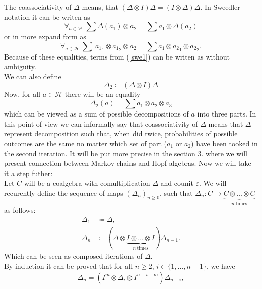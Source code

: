 \documentclass[a4paper]{article}
\begin{document}
The coassociativity of $\Delta$ means, that $(\Delta \otimes I)\Delta = (I \otimes \Delta)\Delta$.
In Sweedler notation it can be writen as
\begin{equation*}
\forall_{a \in \mathcal{H}}\ \sum\Delta(a_1) \otimes a_2 = \sum a_1 \otimes \Delta(a_2)
\end{equation*}
or in more expand form as
\begin{equation}\label{swe1}
\forall_{a\in \mathcal{H}}\ \sum\ {a_1}_1 \otimes {a_1}_2 \otimes a_2 = \sum a_1 \otimes {a_2}_1 
\otimes {a_2}_2.
\end{equation}
Because of these equalities, terms from (\ref{swe1}) can be writen as 
 without ambiguity. \\ We can also define 
\begin{equation*}
\Delta_2 \coloneqq (\Delta \otimes I)\Delta
\end{equation*}
Now, for all $a \in \mathcal{H}$ there will be an equality
\begin{equation*}
\Delta_2(a) = \sum a_1 \otimes a_2 \otimes a_3
\end{equation*}
which can be viewed as a sum of possible decompositions of $a$ into three parts. 
In this point of view we can informally say that coassociativity of $\Delta$ means that $\Delta$ represent
decomposition such that, when did twice, probabilities of possible outcomes are the same 
no matter which set of part ($a_1$ or $a_2$) have been tooked in the second iteration. It will be put more 
precise in the section 3. where we will present connection between Markov chains and Hopf algebras.
Now we will take it a step futher: \\[8pt]
\indent Let $C$ will be a coalgebra with comultiplication $\Delta$ and counit $\varepsilon$. 
We will recurently define the sequence of maps $(\Delta_n)_{n \geq 0}$, such that 
$\Delta_n : C \to \underbrace{C \otimes \dots \otimes C}_{n \mathrm{\ times}}$ as follows:
\begin{align*}
\Delta_1 &\coloneqq \Delta, \\
\Delta_n &\coloneqq (\Delta \otimes \underbrace{I \otimes \dots \otimes I}_{n \mathrm{\ times}})\Delta_{n-1}.
\end{align*}
Which can be seen as composed iterations of $\Delta$. \\
By induction it can be proved that for all $n \geq 2$, $i \in \{1, \dots, n-1\}$, 
 we 
have
\begin{equation*}
\Delta_n = (I^m \otimes \Delta_i \otimes I^{n-i-m})\Delta_{n-i},
\end{equation*}
\end{document}

